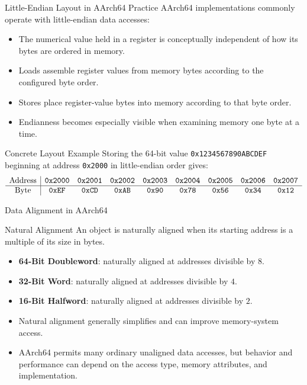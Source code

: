 \documentclass[aspectratio=169,11pt,t]{beamer}
\newcommand{\key}[1]{\textbf{#1}}
\newcommand{\hex}[1]{\texttt{0x#1}}
\begin{document}
\begin{frame}{Little-Endian Layout in AArch64 Practice}
AArch64 implementations commonly operate with little-endian data accesses:
\vspace{0.2em}
\begin{itemize}
\item The numerical value held in a register is conceptually independent of how its bytes are ordered in memory.
\item Loads assemble register values from memory bytes according to the configured byte order.
\item Stores place register-value bytes into memory according to that byte order.
\item Endianness becomes especially visible when examining memory one byte at a time.
\end{itemize}
\vspace{0.3em}
\begin{block}{Concrete Layout Example}
Storing the 64-bit value \hex{1234567890ABCDEF} beginning at address \hex{2000} in little-endian order gives:
\[
\begin{array}{c|cccccccc}
\text{Address} &
\text{\hex{2000}} &
\text{\hex{2001}} &
\text{\hex{2002}} &
\text{\hex{2003}} &
\text{\hex{2004}} &
\text{\hex{2005}} &
\text{\hex{2006}} &
\text{\hex{2007}}
\\
\hline
\text{Byte} &
\text{\hex{EF}} &
\text{\hex{CD}} &
\text{\hex{AB}} &
\text{\hex{90}} &
\text{\hex{78}} &
\text{\hex{56}} &
\text{\hex{34}} &
\text{\hex{12}}
\end{array}
\]
\end{block}
\end{frame}






\begin{frame}{Data Alignment in AArch64}
\begin{block}{Natural Alignment}
An object is naturally aligned when its starting address is a multiple of its size in bytes.
\end{block}
\vspace{0.3em}
\begin{itemize}
\item \key{64-Bit Doubleword}: naturally aligned at addresses divisible by $8$.
\item \key{32-Bit Word}: naturally aligned at addresses divisible by $4$.
\item \key{16-Bit Halfword}: naturally aligned at addresses divisible by $2$.
\item Natural alignment generally simplifies and can improve memory-system access.
\item AArch64 permits many ordinary unaligned data accesses, but behavior and performance can depend on the access type, memory attributes, and implementation.
\end{itemize}
\end{frame}
\end{document}

